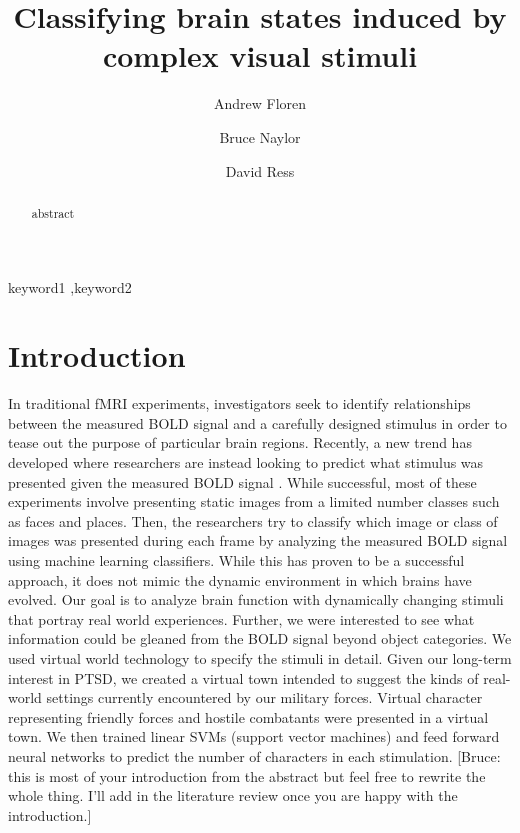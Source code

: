 \documentclass[preprint,authoryear,12pt]{elsarticle}
\begin{document}
\begin{frontmatter}

\title{Classifying brain states induced by complex visual stimuli}

\author[UT]{Andrew Floren}

\author[UT]{Bruce Naylor}

\author[UT]{David Ress}

\address[UT]{The University of Texas at Austin, Austin, TX 78712 USA}


\begin{abstract}
abstract
\end{abstract}

\begin{keyword}
keyword1 \sep keyword2
\end{keyword}

\end{frontmatter}

\section{Introduction}
In traditional fMRI experiments, investigators seek to identify relationships between the measured BOLD signal and a carefully designed stimulus in order to tease out the purpose of particular brain regions.
Recently, a new trend has developed where researchers are instead looking to predict what stimulus was presented given the measured BOLD signal \citep{Haxby2001,Mitchell2003,Haynes2006}.
While successful, most of these experiments involve presenting static images from a limited number classes such as faces and places.
Then, the researchers try to classify which image or class of images was presented during each frame by analyzing the measured BOLD signal using machine learning classifiers.
While this has proven to be a successful approach, it does not mimic the dynamic environment in which brains have evolved.
Our goal is to analyze brain function with dynamically changing stimuli that portray real world experiences.
Further, we were interested to see what information could be gleaned from the BOLD signal beyond object categories.
We used virtual world technology to specify the stimuli in detail.
Given our long-term interest in PTSD, we created a virtual town intended to suggest the kinds of real-world settings currently encountered by our military forces.
Virtual character representing friendly forces and hostile combatants were presented in a virtual town.
We then trained linear SVMs (support vector machines) and feed forward neural networks to predict the number of characters in each stimulation.
[Bruce: this is most of your introduction from the abstract but feel free to rewrite the whole thing. I'll add in the literature review once you are happy with the introduction.]
\end{document}

